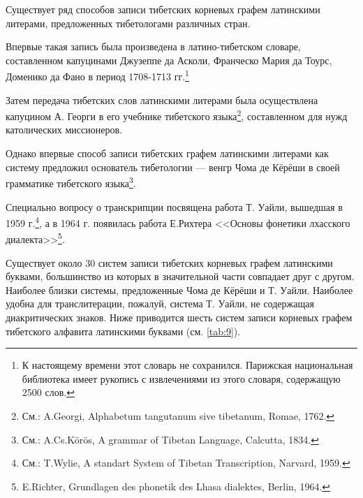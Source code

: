 Существует ряд способов записи тибетских корневых графем латинскими литерами, предложенных тибетологами различных стран.

Впервые такая запись была произведена в латино-тибетском словаре, составленном капуцинами Джузеппе да Асколи, Франческо Мария да Тоурс, Доменико да Фано в период 1708-1713 гг.\footnote[12]{К настоящему времени этот словарь не сохранился. Парижская национальная библиотека имеет рукопись с извлечениями из этого словаря, содержащую 2500 слов.}

Затем передача тибетских слов латинскими литерами была осуществлена капуцином А. Георги в его учебнике тибетского языка\footnote[13]{См.: A.Georgi, Alphabetum tangutanum sive tibetanum, Romae, 1762.}, составленном для нужд католических миссионеров.

Однако впервые способ записи тибетских графем латинскими литерами как систему предложил основатель тибетологии --- венгр Чома де Кёрёши в своей грамматике тибетского языка\footnote[14]{См.: A.Cs.Körös, A grammar of Tibetan Language, Calcutta, 1834.}.

Специально вопросу о транскрипции посвящена работа Т. Уайли, вышедшая в 1959 г.\footnote[15]{См.: T.Wylie, A standart System of Tibetan Transcription, Narvard, 1959.}, а в 1964 г. появилась работа Е.Рихтера <<Основы фонетики лхасского диалекта>>\footnote[16]{E.Richter, Grundlagen des phonetik des Lhasa dialektes, Berlin, 1964.}.

Существует около 30 систем записи тибетских корневых графем латинскими буквами, большинство из которых в значительной части совпадает друг с другом. Наиболее близки системы, предложенные Чома де Кёрёши и Т. Уайли. Наиболее удобна для транслитерации, пожалуй, система Т. Уайли, не содержащая диакритических знаков. Ниже приводится шесть систем записи корневых графем тибетского алфавита латинскими буквами (см. \ref{tab:9}).

\tabulinesep=1mm

